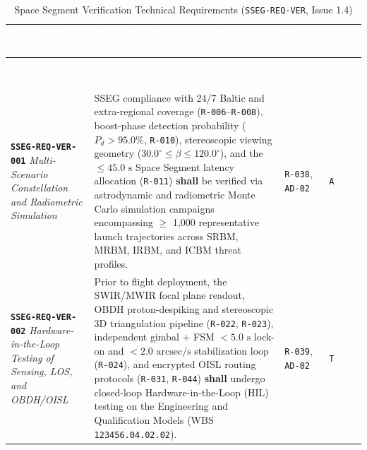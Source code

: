 \documentclass[11pt,a4paper]{article}
\newcommand{\thead}[1]{\textcolor{white}{\textbf{\textsf{#1}}}}
\providecommand{\abbr}[1]{#1}
\begin{document}
{\footnotesize\setlength{\tabcolsep}{4pt}\renewcommand{\arraystretch}{1.15}%
%
%
\setlength{\LTcapwidth}{\textwidth}%
\begin{longtable}{|>{\raggedright\arraybackslash}p{}|>{\raggedright\arraybackslash}p{}|>{\raggedright\arraybackslash}p{}|>{\raggedright\arraybackslash}p{}|}
\caption{Space Segment Verification Technical Requirements (\texttt{SSEG-REQ-VER}, Issue 1.4)}\label{tab:req_ver_i14}\\
\hline
\rowcolor{TableHeaderBlue}
\thead{Req.\ ID \& Title} & \thead{Normative Requirement Statement (\texttt{shall})} & \thead{Parent Req.} & \thead{Verif.} \\ \hline
\endfirsthead
\hline
\rowcolor{TableHeaderBlue}
\thead{Req.\ ID \& Title} & \thead{Normative Requirement Statement (\texttt{shall})} & \thead{Parent Req.} & \thead{Verif.} \\ \hline
\endhead
\endfoot
\endlastfoot
\textbf{\texttt{SSEG-REQ-VER-001}} \newline \emph{Multi-Scenario Constellation and Radiometric Simulation} & \abbr{SSEG} compliance with 24/7 Baltic and extra-regional coverage (\texttt{R-006}--\texttt{R-008}), boost-phase detection probability ($P_d > 95.0\%$, \texttt{R-010}), stereoscopic viewing geometry ($30.0^\circ \le \beta \le 120.0^\circ$), and the $\le 45.0\text{ s}$ Space Segment latency allocation (\texttt{R-011}) \textbf{shall} be verified via astrodynamic and radiometric Monte Carlo simulation campaigns encompassing $\ge$ 1,000 representative launch trajectories across \abbr{SRBM}, \abbr{MRBM}, \abbr{IRBM}, and \abbr{ICBM} threat profiles. & \texttt{R-038}, \newline \texttt{AD-02} & \texttt{A} \\ \hline
\textbf{\texttt{SSEG-REQ-VER-002}} \newline \emph{Hardware-in-the-Loop Testing of Sensing, LOS, and OBDH/OISL} & Prior to flight deployment, the \abbr{SWIR}/\abbr{MWIR} focal plane readout, \abbr{OBDH} proton-despiking and stereoscopic 3D triangulation pipeline (\texttt{R-022}, \texttt{R-023}), independent gimbal + \abbr{FSM} $< 5.0\text{ s}$ lock-on and $< 2.0\text{ arcsec/s}$ stabilization loop (\texttt{R-024}), and encrypted \abbr{OISL} routing protocols (\texttt{R-031}, \texttt{R-044}) \textbf{shall} undergo closed-loop Hardware-in-the-Loop (\abbr{HIL}) testing on the Engineering and Qualification Models (\abbr{WBS} \texttt{123456.04.02.02}). & \texttt{R-039}, \newline \texttt{AD-02} & \texttt{T} \\ \hline

\end{longtable}}
\end{document}
